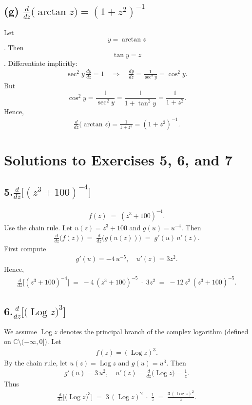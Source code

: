 \documentclass[12pt]{article}
\newcommand{\Log}{\operatorname{Log}}
\theoremstyle{definition} %
\theoremstyle{plain} %
\begin{document}
\subsection*{(g) $\displaystyle \frac{d}{dz}\bigl(\arctan z\bigr) 
             = (1 + z^2)^{-1}$}

Let $$y = \arctan z$$.  Then $$\tan y = z$$.  
Differentiate implicitly:
\begin{align}
\sec^2 y \,\frac{dy}{dz} = 1
\quad \Longrightarrow\quad
\frac{dy}{dz} = \frac{1}{\sec^2 y} = \cos^2 y.
\end{align}
But 
$$\cos^2 y = \frac{1}{\sec^2 y} = \frac{1}{1 + \tan^2 y} = \frac{1}{1 + z^2}.$$
Hence,
\begin{align}
\frac{d}{dz}\bigl(\arctan z\bigr)
  = \frac{1}{1 + z^2} 
  = (1 + z^2)^{-1}.
\end{align}

\section*{Solutions to Exercises 5, 6, and 7}

\subsection*{5.\quad $\displaystyle \frac{d}{dz}\bigl[(z^3 + 100)^{-4}\bigr]$}

\begin{align}
f(z) \;=\; (z^3 + 100)^{-4}.
\end{align}
Use the chain rule.  Let $u(z) = z^3 + 100$ and $g(u) = u^{-4}.$  
Then
\begin{align}
\frac{d}{dz}\bigl(f(z)\bigr)
  \;=\;
  \frac{d}{dz}\bigl(g(u(z))\bigr)
  \;=\;
  g'(u)\,u'(z).
\end{align}
First compute
\begin{align}
g'(u) 
  = -4\,u^{-5}, 
\quad
u'(z) 
  = 3z^2.
\end{align}
Hence,
\begin{align}
\frac{d}{dz}\bigl[(z^3 + 100)^{-4}\bigr]
  \;=\;
  -4\,(z^3 + 100)^{-5}\;\cdot\;3z^2
  \;=\;
  -12\,z^2\,(z^3 + 100)^{-5}.
\end{align}

\subsection*{6.\quad $\displaystyle \frac{d}{dz}\bigl[\bigl(\Log z\bigr)^3\bigr]$}

We assume $\Log z$ denotes the principal branch of the complex logarithm (defined on $\mathbb{C}\setminus(-\infty,0]$).  
Let
\begin{align}
f(z) = (\Log z)^3.
\end{align}
By the chain rule, let $u(z) = \Log z$ and $g(u) = u^3$.  
Then
\begin{align}
g'(u) = 3\,u^2,
\quad
u'(z) = \frac{d}{dz}\bigl(\Log z\bigr) = \frac{1}{z}.
\end{align}
Thus
\begin{align}
\frac{d}{dz}\bigl[\bigl(\Log z\bigr)^3\bigr]
  \;=\;
  3\,(\Log z)^2 \;\cdot\;\frac{1}{z}
  \;=\;
  \frac{3\,(\Log z)^2}{z}.
\end{align}
\end{document}
